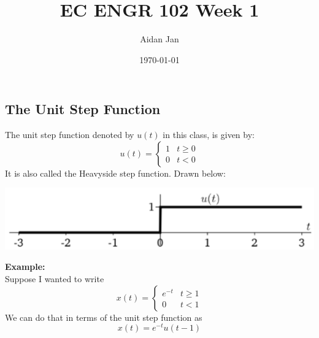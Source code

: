 \documentclass[10pt]{article}
\title{EC ENGR 102 Week 1}
\author{Aidan Jan}
\date{\today}
\newcommand{\example}{\textbf{Example: }}
\begin{document}
\maketitle
\subsection*{The Unit Step Function}
The unit step function denoted by $u(t)$ in this class, is given by:
\[u(t) = \begin{cases} 1 & t \geq 0 \\ 0 & t < 0 \end{cases}\]
It is also called the Heavyside step function.  Drawn below:
\begin{center}
    \includegraphics[scale=0.9]{W2_1.png}
\end{center}
\example\\
Suppose I wanted to write
\[x(t) = \begin{cases}e^{-t} & t \geq 1 \\ 0 & t < 1\end{cases}\]
We can do that in terms of the unit step function as
\[x(t) = e^{-t} u(t - 1)\]
\end{document}
